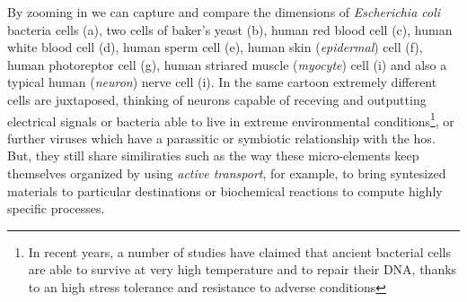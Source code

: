 \documentclass[../main/main.tex]{subfiles}
\begin{document}
By zooming in we can capture and compare the dimensions of \emph{Escherichia coli} bacteria cells (a), two cells of baker's yeast (b), human red blood cell (c), human white blood cell (d), human sperm cell (e), human skin (\emph{epidermal}) cell (f), human photoreptor cell (g), human striared muscle (\emph{myocyte}) cell (i) and also a typical human (\emph{neuron}) nerve cell (i). 
In the same cartoon extremely different cells are juxtaposed, thinking of neurons capable of receving and outputting electrical signals or bacteria able to live in extreme environmental conditions\footnote{In recent years, a number of studies have claimed that ancient bacterial cells are able to survive at very high temperature and to repair their DNA, thanks to an high stress tolerance and resistance to adverse conditions\cite{bacteria}}, or further viruses which have a parassitic or symbiotic relationship with the hos. But, they still share similiraties such as the way these micro-elements keep themselves organized by using \emph{active transport}, for example, to bring syntesized materials to particular destinations or biochemical reactions to compute highly specific processes.   
\end{document}

